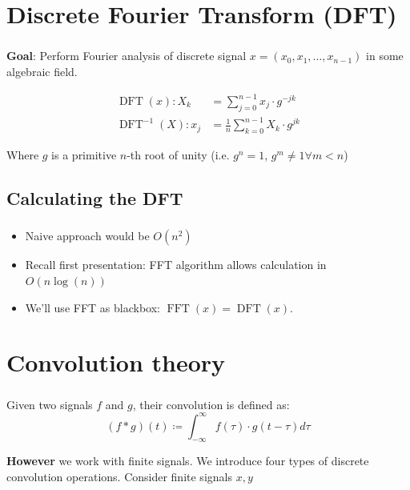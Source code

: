 \documentclass{beamer}
\DeclareMathOperator{\DFT}{DFT}
\DeclareMathOperator{\FFT}{FFT}
\begin{document}
\section{Discrete Fourier Transform (DFT)}

\begin{frame}
		\frametitle{\secname}

		\textbf{Goal}: Perform Fourier analysis of discrete signal $x = (x_0,
		x_1, \ldots, x_{n-1})$ in some algebraic field.

		\begin{align*}
				\DFT(x): X_k & = \sum_{j=0}^{n-1} x_j \cdot g^{-j k} \\
				\DFT^{-1}(X): x_j & = \frac{1}{n} \sum_{k=0}^{n-1} X_k \cdot g^{j k}
		\end{align*}

		Where $g$ is a primitive $n$-th root of unity (i.e. $g^n = 1$, $g^m
		\neq 1 \forall m < n$)
\end{frame}

\subsection{Calculating the DFT}

\begin{frame}
		\frametitle{\secname}
		\framesubtitle{\subsecname}

		\begin{itemize}
				\item Naive approach would be $O(n^2)$
				\item Recall first presentation: FFT algorithm allows calculation in $O(n \log(n))$
				\item We'll use FFT as blackbox: $\FFT(x) = \DFT(x)$.
		\end{itemize}
\end{frame}

\section{Convolution theory}

\begin{frame}
		\frametitle{\secname}

		Given two signals $f$ and $g$, their convolution is defined as:
		\[
				(f * g)(t) \coloneqq \int_{-\infty}^{\infty} f(\tau) \cdot g(t - \tau) d\tau
		\]

		
		\textbf{However} we work with finite signals. We introduce four types
		of discrete convolution operations. Consider finite signals $x, y$
\end{frame}
\end{document}
